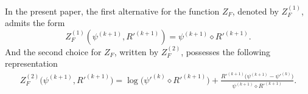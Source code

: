 \documentclass[11pt]{article}
\numberwithin{equation}{section}
\begin{document}
                                                                                                                                                                                                                                                                                                                                                                                                                                                                                                                                                                                                                                                                                                                                                                                                                                                                                                                                                                                                                                                                                                                                                                                                                                                                                                                                                                                                                                                                                                                                                                                                                                                                                                                                                                                                                                                                                                                                    In the present paper, the first alternative for the function $ Z_F$, denoted by $Z_F^{(1)}$,  admits the form 
\begin{equation}\label{z1}
Z_F^{(1)}(\psi^{(k+1)},R'^{(k+1)})=\psi^{(k+1)}\diamond R'^{(k+1)}.
\end{equation}
And the second choice for $ Z_F$, written by $Z_F^{(2)}$,  possesses the following representation 
\begin{equation}\label{z2}
\begin{split}
Z_F^{(2)}\Big(\psi^{(k+1)},R'^{(k+1)}\Big)=\log\Big(\psi'^{(k)}\diamond R'^{(k+1)}\Big)+\frac{R'^{(k+1)}\Big(\psi^{(k+1)}-\psi'^{(k)}\Big)}{\psi^{(k+1)}\diamond R'^{(k+1)}}.
\end{split}
\end{equation}
\end{document}
